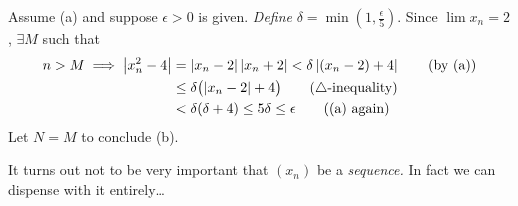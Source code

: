 \begin{tcolorbox}[proofstyle]
	Assume (a) and suppose $\epsilon>0$ is given. \emph{Define} $\delta=\min(1,\frac\epsilon 5)$. Since $\lim x_n=2$, $\exists M$ such that
	\begin{align*}
	n>M \implies  \left| x_n^2-4\right|&=\left| x_n-2\right|\left| x_n+2\right| <\delta\left| (x_n-2)+4\right| \tag{by (a)}\\
	&\le \delta\bigl(\left| x_n-2\right|+4\bigr)\tag{$\triangle$-inequality}\\
	&<\delta(\delta+4)\le 5\delta\le\epsilon \tag{(a) again}
	\end{align*}
	Let $N=M$ to conclude (b).
\end{tcolorbox}

	It turns out not to be very important that $(x_n)$ be a \emph{sequence.} In fact we can dispense with it entirely\ldots

\goodbreak


